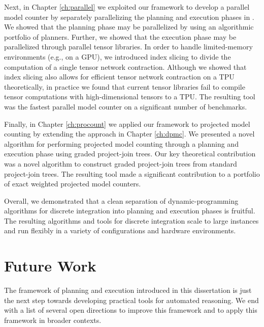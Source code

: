 Next, in Chapter \ref{ch:parallel} we exploited our framework to develop a parallel model counter by separately parallelizing the planning and execution phases in .
We showed that the planning phase may be parallelized by using an algorithmic portfolio \cite{XHHL08} of planners.
Further, we showed that the execution phase may be parallelized through parallel tensor libraries.
In order to handle limited-memory environments (e.g., on a GPU), we introduced index slicing to divide the computation of a single tensor network contraction.
Although we showed that index slicing also allows for efficient tensor network contraction on a TPU theoretically, in practice we found that current tensor libraries fail to compile tensor computations with high-dimensional tensors to a TPU.
The resulting tool  was the fastest parallel model counter on a significant number of benchmarks.

Finally, in Chapter \ref{ch:procount} we applied our framework to projected model counting by extending the approach in Chapter \ref{ch:dpmc}.
We presented a novel algorithm for performing projected model counting through a planning and execution phase using graded project-join trees.
Our key theoretical contribution was a novel algorithm to construct graded project-join trees from standard project-join trees.
The resulting tool  made a significant contribution to a portfolio of exact weighted projected model counters.

Overall, we demonstrated that a clean separation of dynamic-programming algorithms for discrete integration into planning and execution phases is fruitful. The resulting algorithms and tools for discrete integration scale to large instances and run flexibly in a variety of configurations and hardware environments.

\section{Future Work}
The framework of planning and execution introduced in this dissertation is just the next step towards developing practical tools for automated reasoning.
We end with a list of several open directions to improve this framework and to apply this framework in broader contexts.


